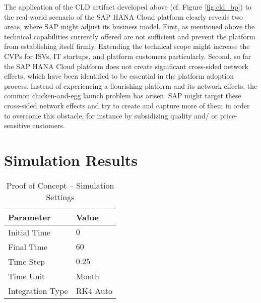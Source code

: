 The application of the \ac{CLD} artifact developed above (cf. Figure \ref{fig:cld_bp}) to the real-world scenario of the SAP HANA Cloud platform clearly reveals two areas, where SAP might adjust its business model. First, as mentioned above the technical capabilities currently offered are not sufficient and prevent the platform from establishing itself firmly. Extending the technical scope might increase the \acp{CVP} for \acp{ISV}, \ac{IT} startups, and platform customers particularly. Second, so far the SAP HANA Cloud platform does not create significant cross-sided network effects, which have been identified to be essential in the platform adoption process. Instead of experiencing a flourishing platform and its network effects, the common chicken-and-egg launch problem has arisen. SAP might target these cross-sided network effects and try to create and capture more of them in order to overcome this obstacle, for instance by subsidizing quality and/ or price-sensitive customers.

\section{Simulation Results}\label{ch:poc:sr}

\begin{table}[t]
	\centering
	\begin{tabular}{ll}
		\toprule 
		\footnotesize \textbf{Parameter} & \footnotesize \textbf{Value} \\ \midrule
		\footnotesize Initial Time & $0$ \\
		\footnotesize Final Time & $60$ \\
		\footnotesize Time Step & $0.25$ \\
		\footnotesize Time Unit & \footnotesize Month \\ \midrule
		\footnotesize Integration Type & \footnotesize RK4 Auto\footnotemark \\ \bottomrule
	\end{tabular}
	\caption{Proof of Concept -- Simulation Settings}
	\label{tab:tb}
\end{table}



